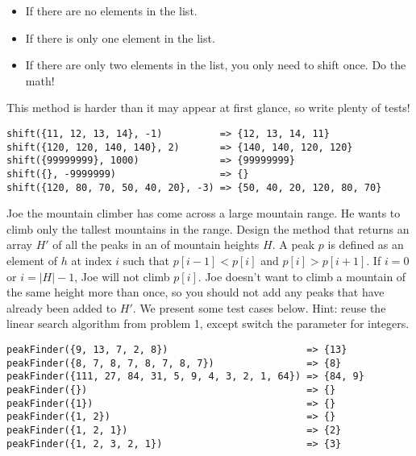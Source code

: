 \begin{itemize}
    \item If there are no elements in the list.
    \item If there is only one element in the list.
    \item If there are only two elements in the list, you only need to shift once. Do the math!
\end{itemize}
    
This method is harder than it may appear at first glance, so write plenty of tests!
\par{
\begin{verbatim}
shift({11, 12, 13, 14}, -1)          => {12, 13, 14, 11}
shift({120, 120, 140, 140}, 2)       => {140, 140, 120, 120}
shift({99999999}, 1000)              => {99999999}
shift({}, -9999999)                  => {}
shift({120, 80, 70, 50, 40, 20}, -3) => {50, 40, 20, 120, 80, 70}
\end{verbatim}
}


Joe the mountain climber has come across a large mountain range. He wants to climb only the tallest mountains in the range. Design the  method that returns an array $H'$ of all the peaks in an  of mountain heights $H$. A peak $p$ is defined as an element of $h$ at index $i$ such that $p[i - 1] < p[i]$ and $p[i] > p[i + 1]$. If $i = 0$ or $i = |H| - 1$, Joe will not climb $p[i]$. Joe doesn't want to climb a mountain of the same height more than once, so you should not add any peaks that have already been added to $H'$. We present some test cases below. Hint: reuse the linear search algorithm from problem 1, except switch the  parameter for integers.

\par{
\begin{verbatim}
peakFinder({9, 13, 7, 2, 8})                        => {13}
peakFinder({8, 7, 8, 7, 8, 7, 8, 7})                => {8}
peakFinder({111, 27, 84, 31, 5, 9, 4, 3, 2, 1, 64}) => {84, 9}
peakFinder({})                                      => {}
peakFinder({1})                                     => {}
peakFinder({1, 2})                                  => {}
peakFinder({1, 2, 1})                               => {2}
peakFinder({1, 2, 3, 2, 1})                         => {3}
\end{verbatim}
}

